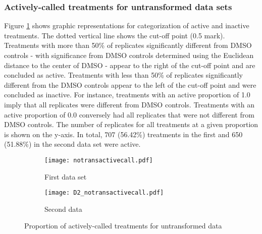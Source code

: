 \documentclass[11pt]{article}
\begin{document}
\subsubsection{Actively-called treatments for untransformed data sets}
\par{Figure \ref{activecallgraphs} shows graphic representations for categorization of active and inactive treatments. The dotted vertical line shows the cut-off point (0.5 mark). Treatments with more than 50\% of replicates significantly different from DMSO controls - with significance from DMSO controls determined using the Euclidean distance to the center of DMSO - appear to the right of the cut-off point and are concluded as active. Treatments with less than 50\% of replicates significantly different from the DMSO controls appear to the left of the cut-off point and were concluded as inactive. For instance, treatments with an active proportion of 1.0 imply that all replicates were different from DMSO controls. Treatments with an active proportion of 0.0 conversely had all replicates that were not different from DMSO controls. The number of replicates for all treatments at a given proportion is shown on the y-axis. In total, 707 (56.42\%) treatments in the first and 650 (51.88\%) in the second data set were active. }
\\

\begin{figure}[ht!] 
  \begin{subfigure}[b]{0.6\linewidth}
    \centering
    \texttt{[image: notransactivecall.pdf]} 
    \caption*{First data set}
     \vspace{1ex}
  \end{subfigure}%
    \begin{subfigure}[b]{0.6\linewidth}
    \centering
    \texttt{[image: D2\_notransactivecall.pdf]}
    \caption*{Second data}
     \vspace{1ex}
  \end{subfigure}%
 \caption{Proportion of actively-called treatments for untransformed data}
 \label{activecallgraphs} 
\end{figure}
\end{document}
